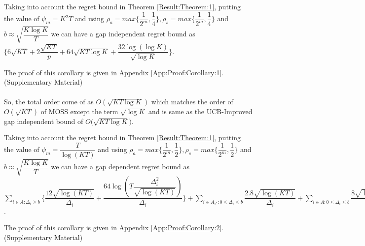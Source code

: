 \begin{corollary}
\label{Result:Corollary:1}
Taking into account the regret bound in Theorem \ref{Result:Theorem:1}, putting the value of $\psi_{m}=K^{2}T$ and using $\rho_{a}=max\bigg\lbrace\dfrac{1}{2^{m}},\dfrac{1}{4}\bigg\rbrace,\rho_{s}=max\bigg\lbrace\dfrac{1}{2^{m}},\dfrac{1}{4}\bigg\rbrace $ and $b\approx\sqrt{\dfrac{K\log K}{T}}$ we can have a gap independent regret bound as $\bigg\lbrace 6\sqrt{KT} + 2\dfrac{\sqrt{KT}}{p} + 64\sqrt{KT\log K} + \dfrac{32\log{(\log K)}}{\sqrt{\log K}}\bigg\rbrace$.
\end{corollary}


	The proof of this corollary is given in Appendix \ref{App:Proof:Corollary:1}.(Supplementary Material)

\paragraph*{} So, the total order come of as $O(\sqrt{KT\log K})$ which matches the order of $O(\sqrt{KT})$ of MOSS except the term $\sqrt{\log K}$ and is same as the UCB-Improved gap independent bound of $O\big(\sqrt{KT\log K}\big)$.

\begin{corollary}
\label{Result:Corollary:2}
Taking into account the regret bound in Theorem \ref{Result:Theorem:1}, putting the value of $\psi_{m}=\dfrac{T}{\log (KT)}$ and using $\rho_{a}=max\bigg\lbrace\dfrac{1}{2^{m}},\dfrac{1}{2}\bigg\rbrace,\rho_{s}=max\bigg\lbrace\dfrac{1}{2^{m}},\dfrac{1}{2}\bigg\rbrace $ and $b\approx\sqrt{\dfrac{K\log K}{T}}$ we can have a gap dependent regret bound as $ \sum_{i\in A:\Delta_{i}\geq b}\bigg\lbrace\dfrac{12\sqrt{\log (KT)}}{\Delta_{i}}  + \dfrac{64\log{(T\dfrac{\Delta_{i}^{2}}{\sqrt{\log (KT)}})}}{\Delta_{i}}\bigg\rbrace + \sum\limits_{i\in A_{s^{*}}:0\leq\Delta_{i}\leq b}\dfrac{2.8\sqrt{\log (KT)}}{\Delta_{i}} + \sum\limits_{i\in A:0\leq\Delta_{i}\leq b}\dfrac{8\sqrt{\log (KT)}}{\Delta_{i}}$.
\end{corollary}

	The proof of this corollary is given in Appendix \ref{App:Proof:Corollary:2}.(Supplementary Material)


